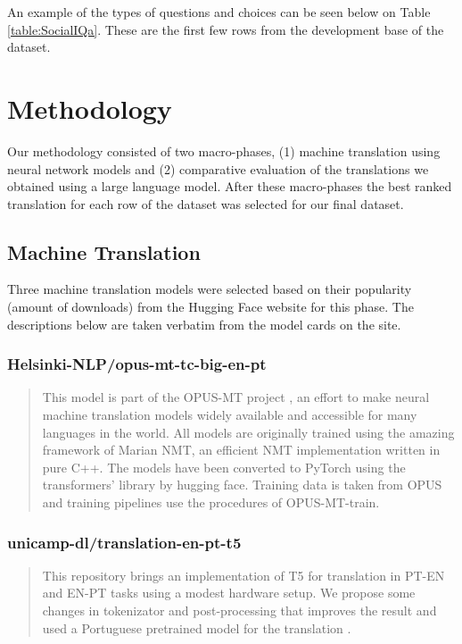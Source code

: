 \documentclass{article}
\begin{document}
An example of the types of questions and choices can be seen below on Table
\ref{table:SocialIQa}. These are the first few rows from the development base of the dataset.
 

\section{Methodology} 

Our methodology consisted of two macro-phases, (1) machine translation using
neural network models and (2) comparative evaluation of the translations we
obtained using a large language model. After these macro-phases the best ranked
translation for each row of the dataset was selected for our final dataset.

\subsection{Machine Translation}
\label{subsec:machine-translation}

Three machine translation models were selected based on their popularity (amount
of downloads) from the Hugging Face website for this phase. The descriptions
below are taken verbatim from the model cards on the site.

\subsubsection{Helsinki-NLP/opus-mt-tc-big-en-pt}

\begin{quote}
This model is part of the OPUS-MT project \cite{tiedemann2020opus}, an effort to
make neural machine translation models widely available and accessible for many
languages in the world. All models are originally trained using the amazing
framework of Marian NMT, an efficient NMT implementation written in pure C++.
The models have been converted to PyTorch using the transformers' library by
hugging face. Training data is taken from OPUS and training pipelines use the
procedures of OPUS-MT-train.
\end{quote}

\subsubsection{unicamp-dl/translation-en-pt-t5}

\begin{quote}
This repository brings an implementation of T5 for translation in PT-EN and
EN-PT tasks using a modest hardware setup. We propose some changes in
tokenizator and post-processing that improves the result and used a Portuguese
pretrained model for the translation \cite{lopes2020lite}.
\end{quote}
\end{document}
